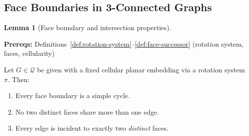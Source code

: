 \documentclass[12pt]{article}
\theoremstyle{definition}
\newtheorem{lemma}[theorem]{Lemma}
\newcommand{\prereq}[1]{\par\noindent\textbf{Prereqs:} #1\par}
\begin{document}
\subsection{Face Boundaries in 3-Connected Graphs}
\label{subsec:face-boundaries}

\begin{lemma}[Face boundary and intersection properties]\label{lem:face-boundary}
\prereq{Definitions~\ref{def:rotation-system}--\ref{def:face-successor} (rotation system, faces, cellularity)}
Let $G\in\mathcal{Q}$ be given with a fixed cellular planar embedding via a rotation system $\pi$.
Then:
\begin{enumerate}
    \item Every face boundary is a simple cycle.
    \item No two distinct faces share more than one edge.
    \item Every edge is incident to exactly two \emph{distinct} faces.
\end{enumerate}
\end{lemma}
\end{document}
